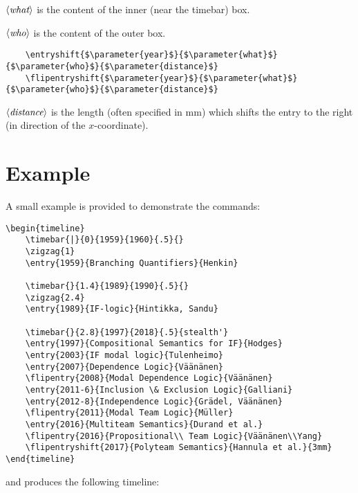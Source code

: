 \documentclass{article}
\newcommand{\parameter}[1]{\langle\normalfont\textit{#1}\rangle}
\begin{document}
\begin{description}
$\parameter{what}$ is the content of the inner (near the timebar) box.

$\parameter{who}$ is the content of the outer box.

\begin{lstlisting}
	\entryshift{$\parameter{year}$}{$\parameter{what}$}{$\parameter{who}$}{$\parameter{distance}$}
	\flipentryshift{$\parameter{year}$}{$\parameter{what}$}{$\parameter{who}$}{$\parameter{distance}$}
\end{lstlisting}

$\parameter{distance}$ is the length (often specified in mm) which shifts the entry to the right (in direction of the $x$-coordinate).
\end{description}

\section{Example}
A small example is provided to demonstrate the commands:

\begin{lstlisting}
\begin{timeline}
 	\timebar{|}{0}{1959}{1960}{.5}{}
	\zigzag{1}
	\entry{1959}{Branching Quantifiers}{Henkin}
  	
	\timebar{}{1.4}{1989}{1990}{.5}{}
	\zigzag{2.4}
	\entry{1989}{IF-logic}{Hintikka, Sandu}

	\timebar{}{2.8}{1997}{2018}{.5}{stealth'}
	\entry{1997}{Compositional Semantics for IF}{Hodges}
	\entry{2003}{IF modal logic}{Tulenheimo}
	\entry{2007}{Dependence Logic}{Väänänen}
	\flipentry{2008}{Modal Dependence Logic}{Väänänen}
	\entry{2011-6}{Inclusion \& Exclusion Logic}{Galliani}
	\entry{2012-8}{Independence Logic}{Grädel, Väänänen}
	\flipentry{2011}{Modal Team Logic}{Müller}
	\entry{2016}{Multiteam Semantics}{Durand et al.}
	\flipentry{2016}{Propositional\\ Team Logic}{Väänänen\\Yang}
	\flipentryshift{2017}{Polyteam Semantics}{Hannula et al.}{3mm}
\end{timeline}
\end{lstlisting}
and produces the following timeline:
\end{document}
